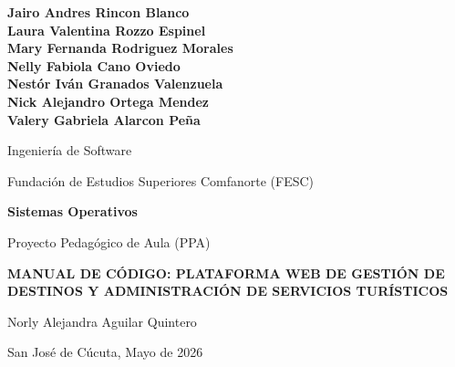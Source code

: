 \documentclass[12pt,letterpaper]{article}
\begin{document}
\begin{titlepage}
    \centering
    \vspace*{0.5in}

    {\normalsize\bfseries
    Jairo Andres Rincon Blanco \\
    Laura Valentina Rozzo Espinel\\
    Mary Fernanda Rodriguez Morales\\
    Nelly Fabiola Cano Oviedo\\
    Nestór Iván Granados Valenzuela\\
    Nick Alejandro Ortega Mendez\\
    Valery Gabriela Alarcon Peña\\
    \par}
    \vspace{0.6in}

    {\normalsize Ingeniería de Software \par}
    \vspace{0.4in}

    {\normalsize Fundación de Estudios Superiores Comfanorte (FESC) \par}
    \vspace{0.6in}

    {\normalsize\bfseries Sistemas Operativos \par}
    \vspace{0.4in}

    {\normalsize Proyecto Pedagógico de Aula (PPA) \par}
    \vspace{0.5in}
    {\normalsize\bfseries MANUAL DE CÓDIGO: PLATAFORMA WEB DE GESTIÓN DE DESTINOS Y ADMINISTRACIÓN DE SERVICIOS TURÍSTICOS\par}
    \vspace{0.6in}

    {\normalsize Norly Alejandra Aguilar Quintero \par}

    \vfill
    {\normalsize San José de Cúcuta, Mayo de 2026 \par}
\end{titlepage}
\end{document}
